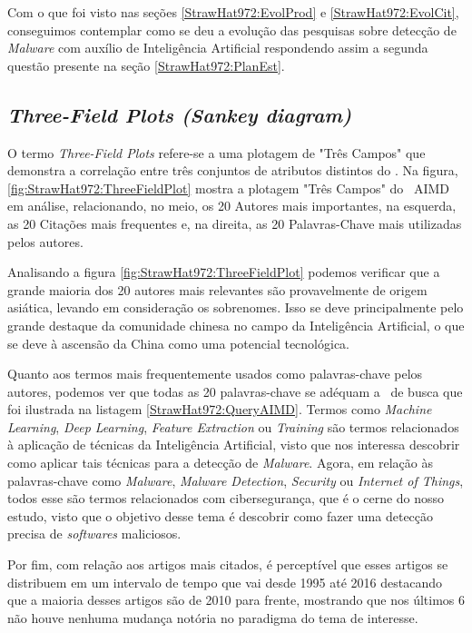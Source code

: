 Com o que foi visto nas seções \ref{StrawHat972:EvolProd} e \ref{StrawHat972:EvolCit}, conseguimos contemplar como se deu a evolução das pesquisas sobre detecção de \textit{Malware} com auxílio de Inteligência Artificial respondendo assim a segunda questão presente na seção \ref{StrawHat972:PlanEst}.

\subsection{\textit{Three-Field Plots (Sankey diagram)}}

O termo \textit{Three-Field Plots} refere-se a uma plotagem de "Três Campos" que demonstra a correlação entre três conjuntos de atributos distintos do \dataset. Na figura, \ref{fig:StrawHat972:ThreeFieldPlot} mostra a plotagem "Três Campos" do \dataset\ AIMD em análise, relacionando, no meio, os 20 Autores mais importantes, na esquerda, as 20 Citações mais frequentes e, na direita, as 20 Palavras-Chave mais utilizadas pelos autores.

Analisando a figura \ref{fig:StrawHat972:ThreeFieldPlot} podemos verificar que a grande maioria dos 20 autores mais relevantes são provavelmente de origem asiática, levando em consideração os sobrenomes. Isso se deve principalmente pelo grande destaque da comunidade chinesa no campo da Inteligência Artificial, o que se deve à ascensão da China como uma potencial tecnológica.

Quanto aos termos mais frequentemente usados como palavras-chave pelos autores, podemos ver que todas as 20 palavras-chave se adéquam a \query\ de busca que foi ilustrada na listagem \ref{StrawHat972:QueryAIMD}. Termos como \textit{Machine Learning}, \textit{Deep Learning}, \textit{Feature Extraction} ou \textit{Training} são termos relacionados à aplicação de técnicas da Inteligência Artificial, visto que nos interessa descobrir como aplicar tais técnicas para a detecção de \textit{Malware}. Agora, em relação às palavras-chave como \textit{Malware}, \textit{Malware Detection}, \textit{Security} ou \textit{Internet of Things}, todos esse são termos relacionados com cibersegurança, que é o cerne do nosso estudo, visto que o objetivo desse tema é descobrir como fazer uma detecção precisa de \textit{softwares} maliciosos.

Por fim, com relação aos artigos mais citados, é perceptível que esses artigos se distribuem em um intervalo de tempo que vai desde 1995 até 2016 destacando que a maioria desses artigos são de 2010 para frente, mostrando que nos últimos 6 não houve nenhuma mudança notória no paradigma do tema de interesse.

